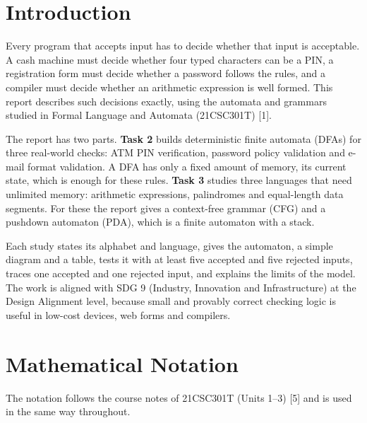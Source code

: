 \documentclass[12pt,a4paper]{article}
\begin{document}
\section{Introduction}

Every program that accepts input has to decide whether that input is acceptable. A cash machine must decide whether four typed characters can be a PIN, a registration form must decide whether a password follows the rules, and a compiler must decide whether an arithmetic expression is well formed. This report describes such decisions exactly, using the automata and grammars studied in Formal Language and Automata (21CSC301T) [1].

The report has two parts. \textbf{Task 2} builds deterministic finite automata (DFAs) for three real-world checks: ATM PIN verification, password policy validation and e-mail format validation. A DFA has only a fixed amount of memory, its current state, which is enough for these rules. \textbf{Task 3} studies three languages that need unlimited memory: arithmetic expressions, palindromes and equal-length data segments. For these the report gives a context-free grammar (CFG) and a pushdown automaton (PDA), which is a finite automaton with a stack.

Each study states its alphabet and language, gives the automaton, a simple diagram and a table, tests it with at least five accepted and five rejected inputs, traces one accepted and one rejected input, and explains the limits of the model. The work is aligned with SDG 9 (Industry, Innovation and Infrastructure) at the Design Alignment level, because small and provably correct checking logic is useful in low-cost devices, web forms and compilers.

\section{Mathematical Notation}

The notation follows the course notes of 21CSC301T (Units 1--3) [5] and is used in the same way throughout.
\end{document}
